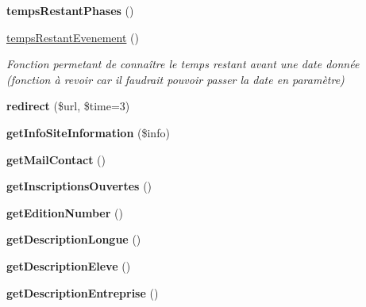 \begin{DoxyCompactItemize}
\item 
\hypertarget{function_8php_ad6f79d8c143ad0f2e5ad98b72dc704c6}{{\bfseries temps\-Restant\-Phases} ()}\label{function_8php_ad6f79d8c143ad0f2e5ad98b72dc704c6}

\item 
\hyperlink{function_8php_aab960eb2647ea0acdae908f5e266f0b7}{temps\-Restant\-Evenement} ()
\begin{DoxyCompactList}\small\item\em Fonction permetant de connaître le temps restant avant une date donnée (fonction à revoir car il faudrait pouvoir passer la date en paramètre) \end{DoxyCompactList}\item 
\hypertarget{function_8php_a05f4bb6d10cc6111be0ac7ef6d64afe2}{{\bfseries redirect} (\$url, \$time=3)}\label{function_8php_a05f4bb6d10cc6111be0ac7ef6d64afe2}

\item 
\hypertarget{function_8php_ae794d06da96bc5584fea22c6cf17e6b1}{{\bfseries get\-Info\-Site\-Information} (\$info)}\label{function_8php_ae794d06da96bc5584fea22c6cf17e6b1}

\item 
\hypertarget{function_8php_aeaa7663b14ca5424bead755e3dc3ad3e}{{\bfseries get\-Mail\-Contact} ()}\label{function_8php_aeaa7663b14ca5424bead755e3dc3ad3e}

\item 
\hypertarget{function_8php_a232dc7b3702c6020351ad2a6d4709440}{{\bfseries get\-Inscriptions\-Ouvertes} ()}\label{function_8php_a232dc7b3702c6020351ad2a6d4709440}

\item 
\hypertarget{function_8php_a6afecdb008ec400eb6ea7e81b390e75a}{{\bfseries get\-Edition\-Number} ()}\label{function_8php_a6afecdb008ec400eb6ea7e81b390e75a}

\item 
\hypertarget{function_8php_a2b58a58c58d378d8e5e45a8a4975a9c6}{{\bfseries get\-Description\-Longue} ()}\label{function_8php_a2b58a58c58d378d8e5e45a8a4975a9c6}

\item 
\hypertarget{function_8php_a14c27ac7d6919e63feeb208b23fb8e0f}{{\bfseries get\-Description\-Eleve} ()}\label{function_8php_a14c27ac7d6919e63feeb208b23fb8e0f}

\item 
\hypertarget{function_8php_a456229c528a5651cdb5a0c9b7c7207a7}{{\bfseries get\-Description\-Entreprise} ()}\label{function_8php_a456229c528a5651cdb5a0c9b7c7207a7}

\end{DoxyCompactItemize}


